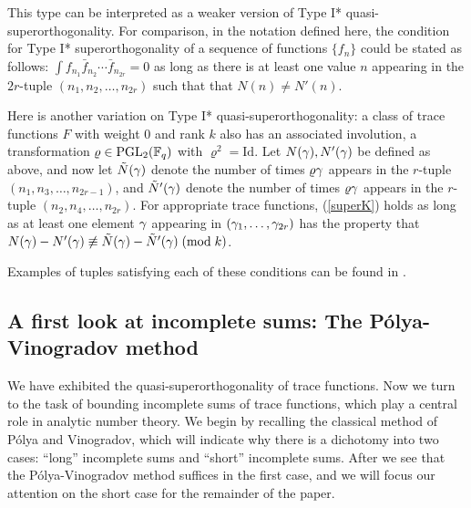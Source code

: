\documentclass[oneside,11pt]{amsart}
\renewcommand{\rho}{\varrho}
\begin{document}
This type can be interpreted as a weaker version  of Type I* quasi-superorthogonality.
For comparison, in the notation defined here, the condition for Type I* superorthogonality of a sequence of functions $\{f_n\}$ could be stated as follows: $\int f_{n_1} \bar{f}_{n_2} \cdots \bar{f}_{n_{2r}}=0$ as long as there is at least one value $n$ appearing in the $2r$-tuple $(n_1,n_2,\ldots,n_{2r})$ such that  that $N(n)  \neq  N'(n)$.
 

Here is another variation on Type I* quasi-superorthogonality:
 a class of trace functions $F$ with weight 0 and rank $k$ also has an associated involution, a transformation $\rho \in \mathrm{PGL}_2(\F_q)$ with $\rho^2 = \mathrm{Id}$.  Let $N(\gamma),N'(\gamma)$ be defined as above, and now let  $\tilde{N}(\gamma)$ denote the number of times $\rho\ga$ appears in the $r$-tuple $(n_1,n_3, \ldots, n_{2r-1})$, and $\tilde{N}'(\gamma)$ denote the number of times $\rho\ga$ appears in the $r$-tuple $(n_2,n_4, \ldots, n_{2r})$. For  appropriate   trace functions, (\ref{superK}) holds as long as at least one element $\gamma$ appearing in $(\gamma_1,\ldots, \gamma_{2r})$ has the property
that $N(\gamma) - N'(\gamma) \not\equiv \tilde{N}(\gamma) -  \tilde{N}'(\gamma)  \; ( \text{mod} \; k)$. 

Examples of tuples satisfying each of these conditions can be found in \cite[Example 1.4]{FKM15}. 

 
\subsection{A first look at incomplete sums: The P\'olya-Vinogradov method}\label{sec_PV}

We have exhibited the quasi-superorthogonality of trace functions. Now we turn to the task of bounding incomplete sums of trace functions, which play a central role in analytic number theory. We begin by recalling the classical method of P\'olya and Vinogradov, which will indicate why there is a dichotomy into two cases: ``long'' incomplete sums and ``short'' incomplete sums. After we see that the P\'olya-Vinogradov method suffices in the first case, and we will focus our attention on the short case for the remainder of the paper.
\end{document}

